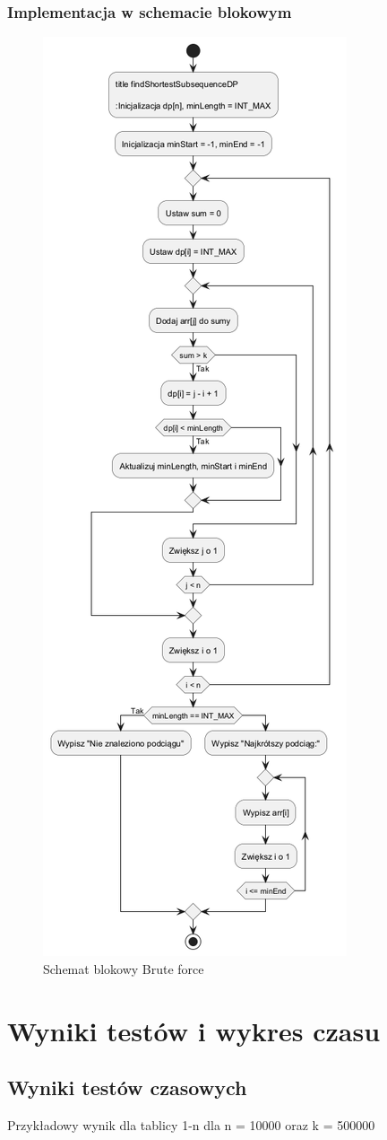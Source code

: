 \documentclass[12pt,twoside]{article}
\begin{document}
\subsubsection{Implementacja w schemacie blokowym}
\clearpage
\begin{figure}
    \centering
    \includegraphics[width=0.5\linewidth]{schemat3.png}
    \caption{Schemat blokowy Brute force}
    \label{fig:enter-label}
\end{figure}

\section{Wyniki testów i wykres czasu}
\subsection{Wyniki testów czasowych}
Przykładowy wynik dla tablicy 1-n dla n = 10000 oraz k = 500000
\end{document}
